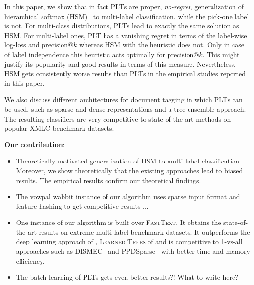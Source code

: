\documentclass{article}
\newcommand{\Algo}[1]{\textsc{#1}}
\begin{document}

In this paper, we show that in fact \Algo{PLT}s are proper, \emph{no-regret}, 
generalization of hierarchical softmax (\Algo{HSM})~\citep{Morin_Bengio_2005}
to multi-label classification, while the pick-one label is not. 
For multi-class distributions, \Algo{PLT}s lead to exactly the
same solution as \Algo{HSM}. 
For multi-label ones, \Algo{PLT} has a vanishing
regret in terms of the label-wise log-loss and precision@$k$ whereas \Algo{HSM} with the heuristic does not.
Only in case of label independence this heuristic acts
optimally for precision@$k$. This might justify its popularity and
good results in terms of this measure. Nevertheless, \Algo{HSM} gets
consistently worse results than \Algo{PLT}s in the empirical studies
reported in this paper.

We also discuss different architectures for document tagging in which
\Algo{PLT}s can be used, such as sparse and dense representations and
a tree-ensemble approach. The resulting classifiers
are very competitive to state-of-the-art methods on popular XMLC
benchmark datasets.


\textbf{Our contribution}:
\begin{itemize}
\item Theoretically motivated generalization of \Algo{HSM} to multi-label classification. 
Moreover, we show theoretically that the existing approaches lead to biased results. The empirical results confirm our theoretical findings.
\item The vowpal wabbit instance of our algorithm uses sparse input format and feature hashing to get competitive results ... 
\item One instance of our algorithm is built over \Algo{FastText}. It obtains the state-of-the-art results on extreme multi-label benchmark datasets. It outperforms the deep learning approach of \citep{Liu_et_al_2017}, \Algo{Learned Trees} of \citep{Jernite_et_al_2017} and is competitive to 1-vs-all approaches such as DISMEC~\cite{Babbar_Scholkopf_2017} and PPDSparse~\cite{Yen_et_al_2017} with better time and memory efficiency.
\item The batch learning of PLTs gets even better results?! What to write here?   
\end{itemize}
\end{document}
